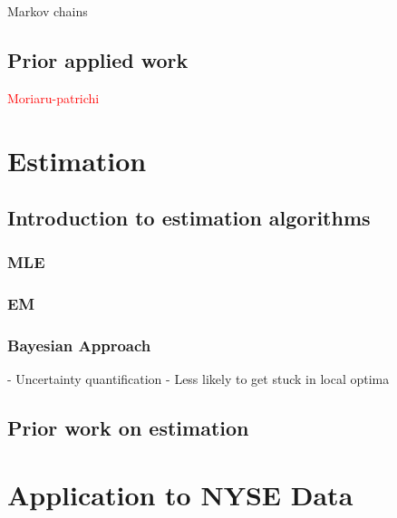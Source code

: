 \documentclass[honours,12pt]{unswthesis}
\numberwithin{equation}{section}
\begin{document}
Markov chains

\section{Prior applied work}
\textcolor{red}{Moriaru-patrichi}

\chapter{Estimation}

\section{Introduction to estimation algorithms}
\subsection{MLE}
\subsection{EM}
\subsection{Bayesian Approach}
- Uncertainty quantification
- Less likely to get stuck in local optima

\section{Prior work on estimation}

\chapter{Application to NYSE Data}
\end{document}
